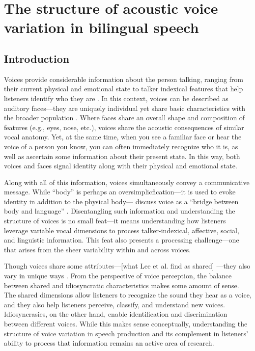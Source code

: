 \setcounter{chapter}{2}
\chapter{The structure of acoustic voice variation in bilingual speech}
\label{ch3:voice}

\section{Introduction}\label{ch3:sec:introduction}

Voices provide considerable information about the person talking, ranging from their current physical and emotional state to talker indexical features that help listeners identify who they are \citep{podesva_2015_voice}. In this context, voices can be described as auditory faces---they are uniquely individual yet share basic characteristics with the broader population \citep{belin_2004_voice}. Where faces share an overall shape and composition of features (e.g., eyes, nose, etc.), voices share the acoustic consequences of similar vocal anatomy. Yet, at the same time, when you see a familiar face or hear the voice of a person you know, you can often immediately recognize who it is, as well as ascertain some information about their present state. In this way, both voices and faces signal identity along with their physical and emotional state. 

Along with all of this information, voices simultaneously convey a communicative message. While ``body'' is perhaps an oversimplicfication---it is used to evoke identity in addition to the physical body---\citeauthor{podesva_2015_voice} discuss voice as a ``bridge between body and language'' \citeyearpar[][p. 175]{podesva_2015_voice}. Disentangling such information and understanding the structure of voices is no small feat---it means understanding how listeners leverage variable vocal dimensions to process talker-indexical, affective, social, and linguistic information. This feat also presents a processing challenge---one that arises from the sheer variability within and across voices. 

Though voices share some attributes---[what Lee et al. find as shared] ---they also vary in unique ways \citep{lee_2019_acoustic}. From the perspective of voice perception, the balance between shared and idiosyncratic characteristics makes some amount of sense. The shared dimensions allow listeners to recognize the sound they hear as a voice, and they also help listeners perceive, classify, and understand new voices. Idiosyncrasies, on the other hand, enable identification and discrimination between different voices. While this makes sense conceptually, understanding the structure of voice variation in speech production and its complement in listeners' ability to process that information remains an active area of research. 


